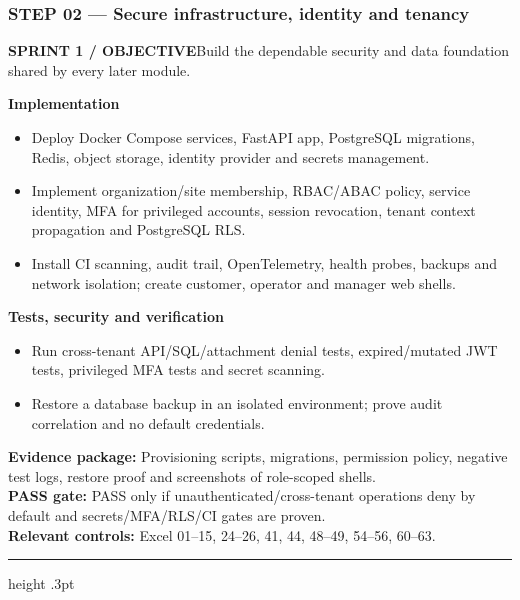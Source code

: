 \documentclass[10.5pt,a4paper,oneside]{article}
\newcommand{\eyebrow}[1]{{\sffamily\footnotesize\bfseries\color{gold}\MakeUppercase{#1}}}
\begin{document}
\subsubsection*{STEP 02 --- Secure infrastructure, identity and tenancy}
\eyebrow{Sprint 1 / objective}\quad Build the dependable security and data foundation shared by every later module.
\begin{tcolorbox}[colback=warm,colframe=line,boxrule=.45pt,arc=2pt,left=8pt,right=8pt,top=6pt,bottom=6pt]\textbf{Implementation}
\begin{itemize}
\item Deploy Docker Compose services, FastAPI app, PostgreSQL migrations, Redis, object storage, identity provider and secrets management.
\item Implement organization/site membership, RBAC/ABAC policy, service identity, MFA for privileged accounts, session revocation, tenant context propagation and PostgreSQL RLS.
\item Install CI scanning, audit trail, OpenTelemetry, health probes, backups and network isolation; create customer, operator and manager web shells.
\end{itemize}
\textbf{Tests, security and verification}
\begin{itemize}
\item Run cross-tenant API/SQL/attachment denial tests, expired/mutated JWT tests, privileged MFA tests and secret scanning.
\item Restore a database backup in an isolated environment; prove audit correlation and no default credentials.
\end{itemize}
\textbf{Evidence package:} Provisioning scripts, migrations, permission policy, negative test logs, restore proof and screenshots of role-scoped shells.\\
\textbf{PASS gate:} PASS only if unauthenticated/cross-tenant operations deny by default and secrets/MFA/RLS/CI gates are proven.\\
\textbf{Relevant controls:} Excel 01--15, 24--26, 41, 44, 48--49, 54--56, 60--63.
\end{tcolorbox}
\medskip\hrule height .3pt\medskip\Needspace{100mm}
\end{document}
